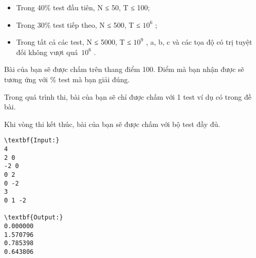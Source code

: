 \begin{itemize}
	\item     Trong 40\% test đầu tiên, N ≤ 50, T ≤ 100;   
	\item     Trong 30\% test tiếp theo, N ≤ 500, T ≤ $10^{6}$    ;   
	\item     Trong tất cả các test, N ≤ 5000, T ≤ $10^{9}$    , a, b, c và các tọa độ có trị tuyệt đối không vượt quá $10^{6}$    .   
\end{itemize}
Bài của bạn sẽ được chấm trên thang điểm 100. Điểm mà bạn nhận được sẽ tương ứng với \% test mà bạn giải đúng.  

   Trong quá trình thi, bài của bạn sẽ chỉ được chấm với 1 test ví dụ có trong đề bài.  

   Khi vòng thi kết thúc, bài của bạn sẽ được chấm với bộ test đầy đủ.  
\begin{itemize}
\end{itemize}
\begin{verbatim}
\textbf{Input:}
4
2 0
-2 0
0 2
0 -2
3
0 1 -2

\textbf{Output:}
0.000000
1.570796
0.785398
0.643806
\end{verbatim}